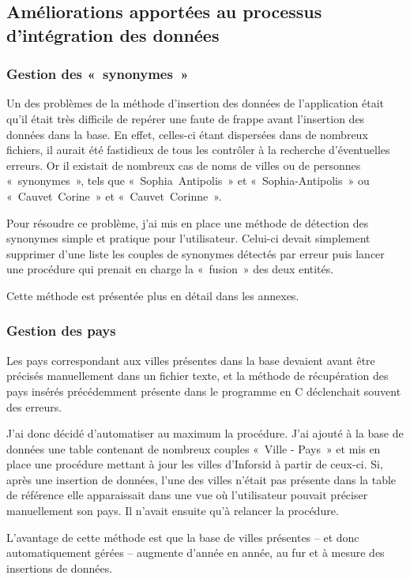 	
			\subsection{Améliorations apportées au processus d'intégration des données}			
		
		\subsubsection{Gestion des «~synonymes~»}
			Un des problèmes de la méthode d'insertion des données de l'application était qu'il était très difficile de repérer une faute de frappe avant l'insertion des données dans la base. En effet, celles-ci étant dispersées dans de nombreux fichiers, il aurait été fastidieux de tous les contrôler à la recherche d'éventuelles erreurs. Or il existait de nombreux cas de noms de villes ou de personnes «~synonymes~», tels que «~Sophia~Antipolis~» et «~Sophia-Antipolis~» ou «~Cauvet~Corine~» et «~Cauvet~Corinne~».
			
			Pour résoudre ce problème, j'ai mis en place une méthode de détection des synonymes simple et pratique pour l'utilisateur. Celui-ci devait simplement supprimer d'une liste les couples de synonymes détectés par erreur puis lancer une procédure qui prenait en charge la «~fusion~» des deux entités.
			
			Cette méthode est présentée plus en détail dans les annexes.
			 
			 
		\subsubsection{Gestion des pays}
			Les pays correspondant aux villes présentes dans la base devaient avant être précisés manuellement dans un fichier texte, et la méthode de récupération des pays insérés précédemment présente dans le programme en C déclenchait souvent des erreurs.
			
			J'ai donc décidé d'automatiser au maximum la procédure. J'ai ajouté à la base de données une table contenant de nombreux couples «~Ville - Pays~» et mis en place une procédure mettant à jour les villes d'Inforsid à partir de ceux-ci. Si, après une insertion de données, l'une des villes n'était pas présente dans la table de référence elle apparaissait dans une vue où l'utilisateur pouvait préciser manuellement son pays. Il n'avait ensuite qu'à relancer la procédure.
			
			L'avantage de cette méthode est que la base de villes présentes  -- et donc automatiquement gérées -- augmente d'année en année, au fur et à mesure des insertions de données.
	

